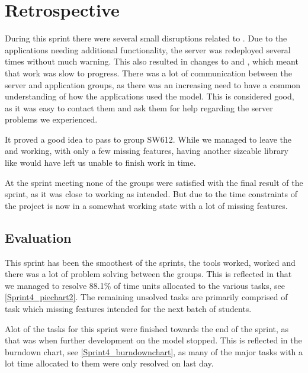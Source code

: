 \section{Retrospective}
During this sprint there were several small disruptions related to .
Due to the applications needing additional functionality, the server was
redeployed several times without much warning. This also resulted in changes to
 and , which meant that work was
slow to progress. There was a lot of communication between the
server and application groups, as there was an increasing need to have a common
understanding of how the applications used the model. This is considered good,
as it was easy to contact them and ask them for help regarding the server
problems we experienced.\nl

It proved a good idea to pass  to group SW612. While we
managed to leave the  and  working, with
only a few missing features, having another sizeable library like
 would have left us unable to finish work in time.\nl

At the sprint meeting none of the groups were satisfied with the final result of
the sprint, as it was close to working as intended. But due to the time
constraints of the project is now in a somewhat working state with a lot of
missing features.\nl

\subsection{Evaluation}

This sprint has been the smoothest of the sprints, the tools worked,
 worked and there was a lot of problem solving between the groups.
This is reflected in that we managed to resolve 88.1\% of time units allocated
to the various tasks, see \autoref{Sprint4_piechart2}. The remaining unsolved
tasks are primarily comprised of task which missing features intended for the
next batch of students.


Alot of the tasks for this sprint were finished towards the end of the sprint,
as that was when further development on the  model stopped. This is
reflected in the burndown chart, see \autoref{Sprint4_burndownchart}, as many of
the major tasks with a lot time allocated to them were only resolved on last
day.


